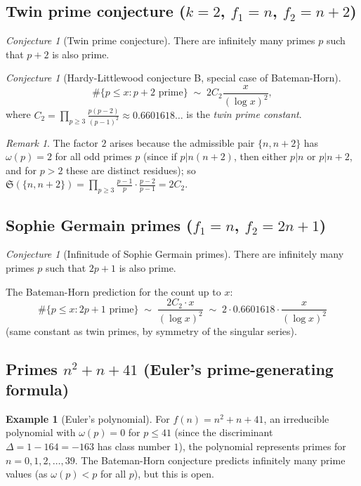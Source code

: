 \documentclass[12pt,a4paper]{amsart}
\theoremstyle{definition}
\newtheorem{example}[theorem]{Example}
\theoremstyle{remark}
\newtheorem{remark}[theorem]{Remark}
\newtheorem{conjecture}[theorem]{Conjecture}
\newcommand{\BH}{\mathfrak{S}}
\begin{document}
\subsection{Twin prime conjecture ($k=2$, $f_1=n$, $f_2=n+2$)}

\begin{conjecture}[Twin prime conjecture]\label{conj:twin}
  There are infinitely many primes $p$ such that $p+2$ is also prime.
\end{conjecture}

\begin{conjecture}[Hardy-Littlewood conjecture B, special case of Bateman-Horn]
  \[
    \#\{p \leq x : p+2 \text{ prime}\} \;\sim\;
    2C_2 \frac{x}{(\log x)^2},
  \]
  where $C_2 = \prod_{p \geq 3} \frac{p(p-2)}{(p-1)^2} \approx 0.6601618\ldots$
  is the \emph{twin prime constant}.
\end{conjecture}

\begin{remark}
  The factor $2$ arises because the admissible pair $\{n, n+2\}$ has $\omega(p) = 2$
  for all odd primes $p$ (since if $p | n(n+2)$, then either $p|n$ or $p|n+2$, and
  for $p > 2$ these are distinct residues); so
  $\BH(\{n,n+2\}) = \prod_{p\geq 3} \frac{p-1}{p} \cdot \frac{p-2}{p-1} = 2C_2$.
\end{remark}

\subsection{Sophie Germain primes ($f_1 = n$, $f_2 = 2n+1$)}

\begin{conjecture}[Infinitude of Sophie Germain primes]\label{conj:sg}
  There are infinitely many primes $p$ such that $2p+1$ is also prime.
\end{conjecture}

The Bateman-Horn prediction for the count up to $x$:
\[
  \#\{p \leq x : 2p+1 \text{ prime}\}
  \;\sim\;
  \frac{2C_2 \cdot x}{(\log x)^2}
  \;\sim\; 2 \cdot 0.6601618 \cdot \frac{x}{(\log x)^2}
\]
(same constant as twin primes, by symmetry of the singular series).

\subsection{Primes $n^2 + n + 41$ (Euler's prime-generating formula)}

\begin{example}[Euler's polynomial]
  For $f(n) = n^2 + n + 41$, an irreducible polynomial with $\omega(p) = 0$ for
  $p \leq 41$ (since the discriminant $\Delta = 1 - 164 = -163$ has class number $1$),
  the polynomial represents primes for $n = 0, 1, 2, \ldots, 39$.
  The Bateman-Horn conjecture predicts infinitely many prime values (as $\omega(p) < p$
  for all $p$), but this is open.
\end{example}
\end{document}
